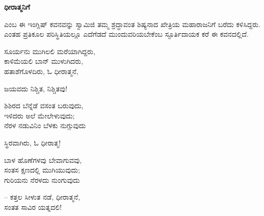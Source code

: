 \begin{myquote}
\end{myquote}

\begin{myquote}
\end{myquote}

\begin{center}
\textbf{ಧೀರಾತ್ಮನಿಗೆ}
\end{center}

 ಎಂಬ ಈ ಇಂಗ್ಲಿಷ್ ಕವನವನ್ನು ಸ್ವಾಮಿಜಿ ತಮ್ಮ ಶ್ರದ್ಧಾವಂತ ಶಿಷ್ಯನಾದ ಖೇತ್ರಿಯ ಮಹಾರಾಜನಿಗೆ ಬರೆದು ಕಳಿಸಿದ್ದರು. ಎಂತಹ ಪ್ರತಿಕೂಲ ಪರಿಸ್ಥಿತಿಯಲ್ಲೂ ಎದೆಗೆಡದೆ ಮುಂದುವರಿಯಬೇಕೆಂಬ ಸ್ಫೂರ್ತಿದಾಯಕ ಕರೆ ಈ ಕವನದಲ್ಲಿದೆ.

\begin{myquote}
ಸೂರ್ಯನು ಮುಗಿಲಲಿ ಮರೆಯಾಗಿದ್ದರು,\\ಕಾಳಿಮೆಯಲಿ ಬಾನ್ ಮುಳುಗಿದರು,\\ಹತಾಶೆಗೊಳದಿರು, ಓ ಧೀರಾತ್ಮನೆ,
\end{myquote}

\begin{flushright}
ಜಯವದು ನಿಶ್ಚಿತ, ನಿಶ್ಚಿತವು!
\end{flushright}

\begin{myquote}
ಶಿಶಿರದ ಬೆನ್ನೆಡೆ ವಸಂತ ಬರುವುದು,\\ಇಳಿದರು ಅಲೆ ಮೇಲೇಳುವುದು;\\ನೆರಳ ನಡುವಿನಿಂ ಬೆಳಕು ನುಗ್ಗುವುದು
\end{myquote}

\begin{flushright}
ಸ್ಥಿರವಾಗಿರು, ಓ ಧೀರಾತ್ಮ!
\end{flushright}

\begin{myquote}
ಬಾಳ ಹೊಣೆಗಳವು ಬೇವಾಗುವವು,\\ಸಂತಸ ಕ್ಷಣದಲ್ಲಿ ಮುಗಿಯುವುದು;\\ಗುರಿಯನು ನೆರಳದು ನುಂಗುವುದು
\end{myquote}

\begin{flushright}
– ಕತ್ತಲ ಸೀಳುತ ನಡೆ, ಧೀರಾತ್ಮನೆ,\\ಸಂತತ ಸಾವಿರ ಯತ್ನದಲಿ!
\end{flushright}


